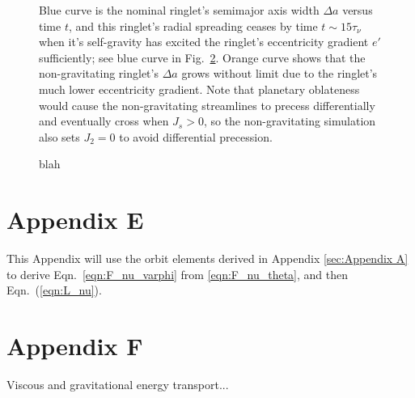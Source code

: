 \documentclass[preprint]{aastex62}
\begin{document}
\begin{figure}
    \caption{
        \label{fig:da_nogravity}
        Blue curve is the nominal ringlet's semimajor axis width $\Delta a$ versus time $t$,
        and this ringlet's radial spreading ceases by time $t\sim15\tau_\nu$ when it's self-gravity
        has excited the ringlet's eccentricity gradient $e'$ sufficiently; 
        see blue curve in Fig.\ \ref{fig:de_prime_nogravity}. Orange curve shows that
        the non-gravitating ringlet's $\Delta a$ grows without limit due to the ringlet's
        much lower eccentricity gradient. Note that planetary oblateness would
        cause the non-gravitating streamlines to precess differentially and eventually cross
        when $J_s>0$, so the non-gravitating simulation also sets $J_2=0$ 
        to avoid differential precession.
    }
\end{figure}

\begin{figure}
    \caption{
        \label{fig:de_prime_nogravity}
        blah
    }
\end{figure}

\section{Appendix E}
\label{sec:Appendix E}

This Appendix will use the orbit elements derived in Appendix \ref{sec:Appendix A} to
derive Eqn.\ \ref{eqn:F_nu_varphi} from \ref{eqn:F_nu_theta}, and then Eqn.\ (\ref{eqn:L_nu}).

\section{Appendix F}
\label{sec:Appendix F}

Viscous and gravitational energy transport...



\end{document}
